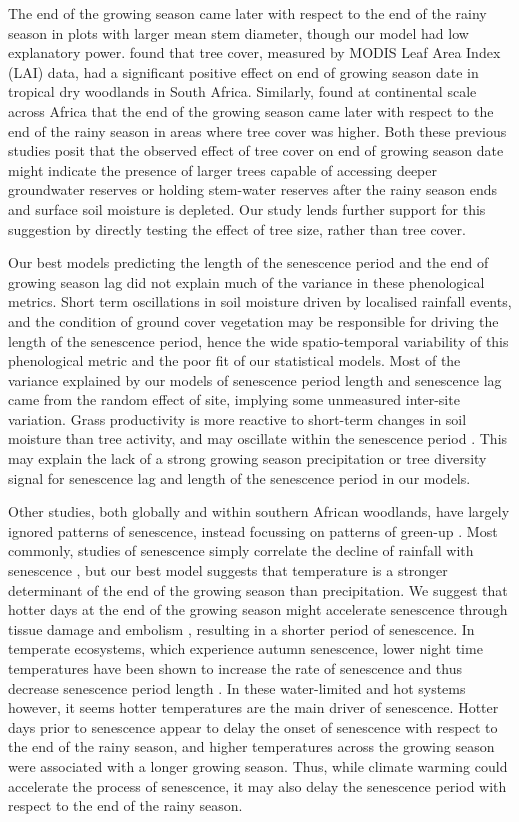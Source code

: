 \documentclass[11pt,a4paper]{article}
\begin{document}
The end of the growing season came later with respect to the end of the rainy
season in plots with larger mean stem diameter, though our model had low
explanatory power. \citet{Cho2017} found that tree cover, measured by MODIS
Leaf Area Index (LAI) data, had a significant positive effect on end of growing
season date in tropical dry woodlands in South Africa. Similarly,
\citet{Guan2014} found at continental scale across Africa that the end of the
growing season came later with respect to the end of the rainy season in areas
where tree cover was higher. Both these previous studies posit that the
observed effect of tree cover on end of growing season date might indicate the
presence of larger trees capable of accessing deeper groundwater reserves or
holding stem-water reserves after the rainy season ends and surface soil
moisture is depleted. Our study lends further support for this suggestion by
directly testing the effect of tree size, rather than tree cover. 

Our best models predicting the length of the senescence period and the end of
growing season lag did not explain much of the variance in these phenological
metrics. Short term oscillations in soil moisture driven by localised rainfall
events, and the condition of ground cover vegetation may be responsible for
driving the length of the senescence period, hence the wide spatio-temporal
variability of this phenological metric and the poor fit of our statistical
models. Most of the variance explained by our models of senescence period
length and senescence lag came from the random effect of site, implying some
unmeasured inter-site variation. Grass productivity is more reactive to
short-term changes in soil moisture than tree activity, and may oscillate
within the senescence period \citep{Archibald2007}. This may explain the lack
of a strong growing season precipitation or tree diversity signal for
senescence lag and length of the senescence period in our models.

Other studies, both globally and within southern African woodlands, have
largely ignored patterns of senescence, instead focussing on patterns of
green-up \citep{Gallinat2015}. Most commonly, studies of senescence simply
correlate the decline of rainfall with senescence \citep{Stevens2016,
Guan2014}, but our best model suggests that temperature is a stronger
determinant of the end of the growing season than precipitation. We suggest
that hotter days at the end of the growing season might accelerate senescence
through tissue damage and embolism \citep{Cho2017}, resulting in a shorter
period of senescence. In temperate ecosystems, which experience autumn
senescence, lower night time temperatures have been shown to increase the rate
of senescence and thus decrease senescence period length \citep{Michelson2017,
Escamilla2020}. In these water-limited and hot systems however, it seems hotter
temperatures are the main driver of senescence. Hotter days prior to senescence
appear to delay the onset of senescence with respect to the end of the rainy
season, and higher temperatures across the growing season were associated with
a longer growing season. Thus, while climate warming could accelerate the
process of senescence, it may also delay the senescence period with respect to
the end of the rainy season.
\end{document}
